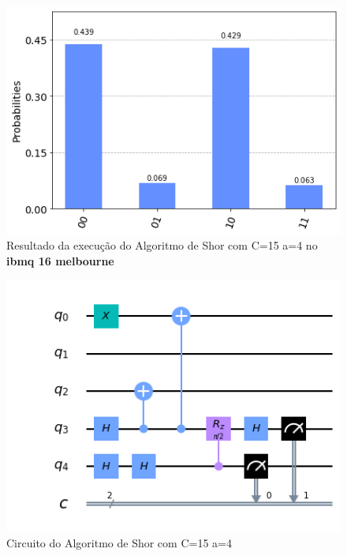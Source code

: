 \documentclass[12pt,a4paper]{article}
\begin{document}
\begin{figure}[h!]
    \centering
    \includegraphics[width=1\textwidth]{shora4cq.png}
        \caption{Resultado da execução do Algoritmo de Shor com C=15 a=4 no \textbf{ibmq 16 melbourne}}
    \label{fig:groovercq}
\end{figure}


\begin{figure}[h!]
    \centering
    \includegraphics[width=1\textwidth]{shora4draw.png}
        \caption{Circuito do Algoritmo de Shor com C=15 a=4}
    \label{fig:groovercq}
\end{figure}
\end{document}
